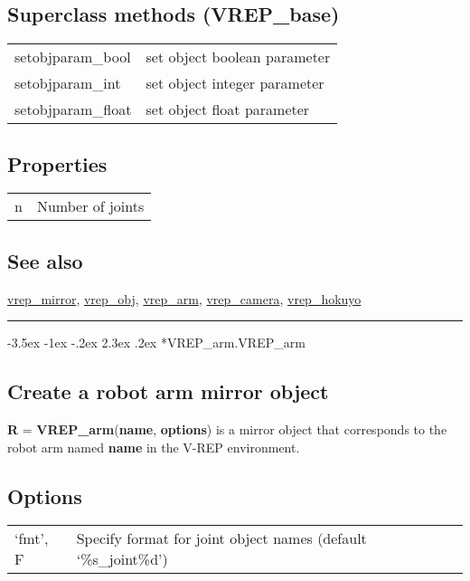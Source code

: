 \documentclass[a4paper]{article}
\makeatletter
\renewcommand\section{%
\@startsection{section}{1}{\z@}%
  {-3.5ex \@plus -1ex \@minus -.2ex}%
  {2.3ex \@plus.2ex}%
  {\color{red}\sffamily\huge\bfseries}}
\makeatother
\begin{document}
\subsection*{Superclass methods (VREP\_base)}
\begin{tabular}{lp{120mm}}
 setobjparam\_bool & set object boolean parameter\\ 
 setobjparam\_int & set object integer parameter\\ 
 setobjparam\_float & set object float parameter\\ 
\end{tabular}\vspace{1ex}
\subsection*{Properties}
\begin{tabular}{lp{120mm}}
 n  & Number of joints\\ 
\end{tabular}\vspace{1ex}
\subsection*{See also}


\hyperlink{vrep_mirror}{\color{blue} vrep\_mirror}, \hyperlink{vrep_obj}{\color{blue} vrep\_obj}, \hyperlink{vrep_arm}{\color{blue} vrep\_arm}, \hyperlink{vrep_camera}{\color{blue} vrep\_camera}, \hyperlink{vrep_hokuyo}{\color{blue} vrep\_hokuyo}

\vspace{1.5ex}\hrule

\hypertarget{VREP\_arm.VREP\_arm}{\section*{VREP\_arm.VREP\_arm}}
\subsection*{Create a robot arm mirror object}
\textbf{R} = \textbf{\color{red} VREP\_arm}(\textbf{name}, \textbf{options}) is a mirror object that corresponds to the
robot arm named \textbf{name} in the V-REP environment.

\subsection*{Options}
\begin{tabular}{lp{120mm}}
`fmt', F & Specify format for joint object names (default `\%s\_joint\%d')\\ 
\end{tabular}\vspace{1ex}
\end{document}
